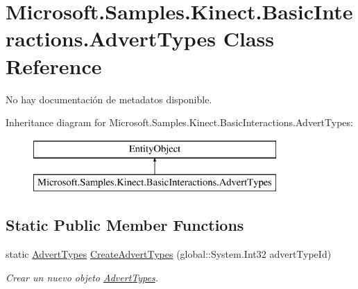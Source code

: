 \hypertarget{class_microsoft_1_1_samples_1_1_kinect_1_1_basic_interactions_1_1_advert_types}{\section{Microsoft.\-Samples.\-Kinect.\-Basic\-Interactions.\-Advert\-Types Class Reference}
\label{class_microsoft_1_1_samples_1_1_kinect_1_1_basic_interactions_1_1_advert_types}
}


No hay documentación de metadatos disponible.  


Inheritance diagram for Microsoft.\-Samples.\-Kinect.\-Basic\-Interactions.\-Advert\-Types\-:\begin{figure}[H]
\begin{center}
\leavevmode
\includegraphics[height=2.000000cm]{class_microsoft_1_1_samples_1_1_kinect_1_1_basic_interactions_1_1_advert_types}
\end{center}
\end{figure}
\subsection*{Static Public Member Functions}
\begin{DoxyCompactItemize}
\item 
static \hyperlink{class_microsoft_1_1_samples_1_1_kinect_1_1_basic_interactions_1_1_advert_types}{Advert\-Types} \hyperlink{class_microsoft_1_1_samples_1_1_kinect_1_1_basic_interactions_1_1_advert_types_aec45e754f64e4d2fd78d9b608cc1a50f}{Create\-Advert\-Types} (global\-::\-System.\-Int32 advert\-Type\-Id)
\begin{DoxyCompactList}\small\item\em Crear un nuevo objeto \hyperlink{class_microsoft_1_1_samples_1_1_kinect_1_1_basic_interactions_1_1_advert_types}{Advert\-Types}. \end{DoxyCompactList}\end{DoxyCompactItemize}
